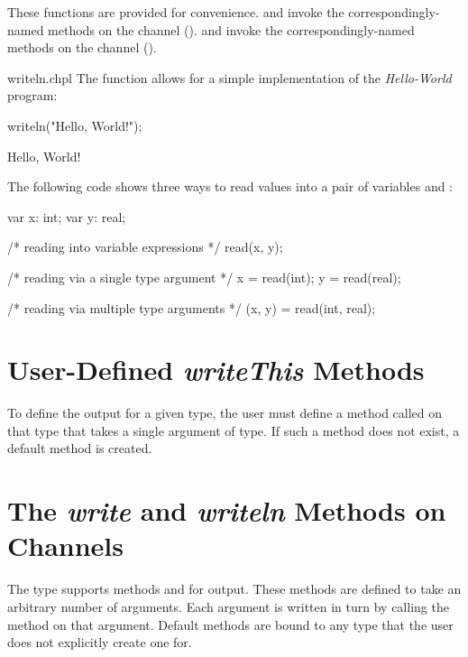 These functions are provided for convenience.
 and  invoke the correspondingly-named methods
on the  channel ().
 and  invoke the correspondingly-named methods
on the  channel ().

\begin{chapelexample}{writeln.chpl}
The  function allows for a simple implementation
of the {\em Hello-World} program:
\begin{chapel}
writeln("Hello, World!");
\end{chapel}
\begin{chapelprintoutput}
Hello, World!
\end{chapelprintoutput}
\end{chapelexample}

\begin{example}
The following code shows three ways to read values into a pair of
variables  and :
\begin{chapel}
var x: int;
var y: real;

/* reading into variable expressions */
read(x, y);

/* reading via a single type argument */
x = read(int);
y = read(real);

/* reading via multiple type arguments */
(x, y) = read(int, real);
\end{chapel}
\end{example}

\section{User-Defined {\em writeThis} Methods}

To define the output for a given type, the user must define a method
called  on that type that takes a single argument of
 type.  If such a method does not exist, a default method is
created.

\section{The {\em write} and {\em writeln} Methods on Channels}
\label{IO_channel_write}

The  type supports methods  and 
for output.  These methods are defined to take an arbitrary number of
arguments.  Each argument is written in turn by calling
the  method on that argument.
Default  methods are bound to any type that the user
does not explicitly create one for.

